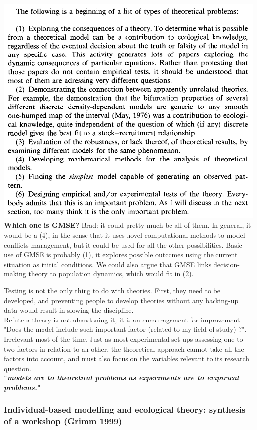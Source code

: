 \documentclass[12pt]{article}
\begin{document}
\includegraphics[scale=0.5]{theoreticalProblems1988.png}\\
\textbf{Which one is GMSE?} Brad: it could pretty much be all of them. In general, it would be a (4), in the sense that it uses novel computational methods to model conflicts management, but it could be used for all the other possibilities. Basic use of GMSE is probably (1), it explores possible outcomes using the current situation as initial conditions. We could also argue that GMSE links decision-making theory to population dynamics, which would fit in (2).

Testing is not the only thing to do with theories. First, they need to be developed, and preventing people to develop theories without any backing-up data would result in slowing the discipline.\\
Refute a theory is not abandoning it, it is an encouragement for improvement.\\
"Does the model include such important factor (related to my field of study) ?". Irrelevant most of the time. Just as most experimental set-ups assessing one to two factors in relation to an other, the theoretical approach cannot take all the factors into account, and must also focus on the variables relevant to its research question.\\
\textbf{"\textit{models are to theoretical problems as experiments are to empirical problems.}"}

\subsubsection{Individual-based  modelling  and  ecological  theory: synthesis  of  a  workshop (Grimm 1999)}
\end{document}
